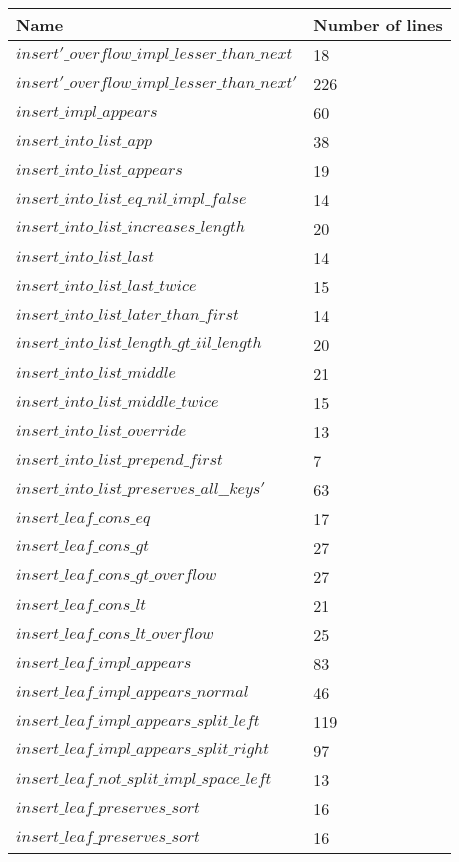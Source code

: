 \begin{tabular}{| l | l |}
\hline
Name & Number of lines \\ \hline
$insert'\_overflow\_impl\_lesser\_than\_next$ & 18 \\ \hline
$insert'\_overflow\_impl\_lesser\_than\_next'$ & 226 \\ \hline
$insert\_impl\_appears$ & 60 \\ \hline
$insert\_into\_list\_app$ & 38 \\ \hline
$insert\_into\_list\_appears$ & 19 \\ \hline
$insert\_into\_list\_eq\_nil\_impl\_false$ & 14 \\ \hline
$insert\_into\_list\_increases\_length$ & 20 \\ \hline
$insert\_into\_list\_last$ & 14 \\ \hline
$insert\_into\_list\_last\_twice$ & 15 \\ \hline
$insert\_into\_list\_later\_than\_first$ & 14 \\ \hline
$insert\_into\_list\_length\_gt\_iil\_length$ & 20 \\ \hline
$insert\_into\_list\_middle$ & 21 \\ \hline
$insert\_into\_list\_middle\_twice$ & 15 \\ \hline
$insert\_into\_list\_override$ & 13 \\ \hline
$insert\_into\_list\_prepend\_first$ & 7 \\ \hline
$insert\_into\_list\_preserves\_all\_\_keys'$ & 63 \\ \hline
$insert\_leaf\_cons\_eq$ & 17 \\ \hline
$insert\_leaf\_cons\_gt$ & 27 \\ \hline
$insert\_leaf\_cons\_gt\_overflow$ & 27 \\ \hline
$insert\_leaf\_cons\_lt$ & 21 \\ \hline
$insert\_leaf\_cons\_lt\_overflow$ & 25 \\ \hline
$insert\_leaf\_impl\_appears$ & 83 \\ \hline
$insert\_leaf\_impl\_appears\_normal$ & 46 \\ \hline
$insert\_leaf\_impl\_appears\_split\_left$ & 119 \\ \hline
$insert\_leaf\_impl\_appears\_split\_right$ & 97 \\ \hline
$insert\_leaf\_not\_split\_impl\_space\_left$ & 13 \\ \hline
$insert\_leaf\_preserves\_sort$ & 16 \\ \hline
$insert\_leaf\_preserves\_sort$ & 16 \\ \hline

\end{tabular}
